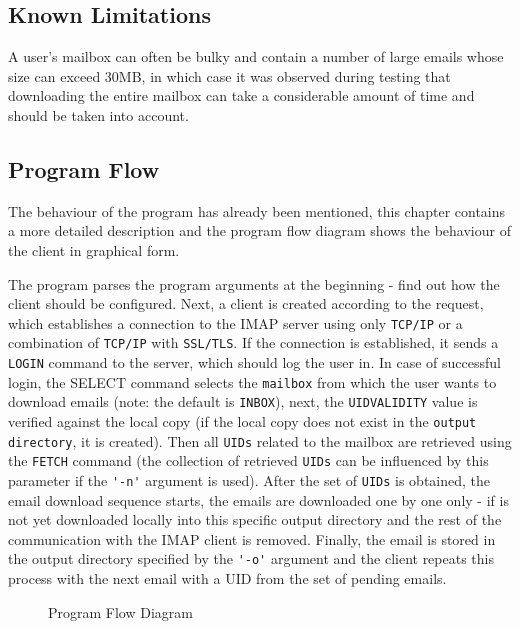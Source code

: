 \documentclass[a4paper,11pt]{article}
\begin{document}
\subsection{Known Limitations}
A user's mailbox can often be bulky and contain a number of large emails whose size can exceed 30MB, 
in which case it was observed during testing that downloading the entire mailbox can take a 
considerable amount of time and should be taken into account. 


\subsection{Program Flow}
The behaviour of the program has already been mentioned, this chapter contains a more detailed 
description and the program flow diagram shows the behaviour of the client in graphical form.

The program parses the program arguments at the beginning - find out how the client should be 
configured. Next, a client is created according to the request, which establishes a connection 
to the IMAP server using only \verb!TCP/IP! or a combination of \verb!TCP/IP! with \verb!SSL/TLS!.
If the connection is established, it sends a \verb!LOGIN! command to the server, which should log 
the user in. In case of successful login, the SELECT command selects the \verb!mailbox! from which 
the user wants to download emails (note: the default is \verb!INBOX!), next, the \verb!UIDVALIDITY! 
value is verified against the local copy (if the local copy does not exist in the 
\verb!output directory!, it is created). Then all \verb!UIDs! related to the mailbox are retrieved using 
the \verb!FETCH! command (the collection of retrieved \verb!UIDs! can be influenced by this parameter if the 
\verb!'-n'! argument is used). After the set of \verb!UIDs! is obtained, the email download sequence 
starts, the emails are downloaded one by one only - if is not yet downloaded locally into this specific output directory 
and the rest of the communication with the IMAP client is removed. Finally, the email is stored 
in the output directory specified by the \verb!'-o'! argument and the client repeats this 
process with the next email with a UID from the set of pending emails.

\begin{figure}[H]
    \centering
    \caption{Program Flow Diagram}
    \label{figure:program-flow-diagram}
\end{figure}
\end{document}
